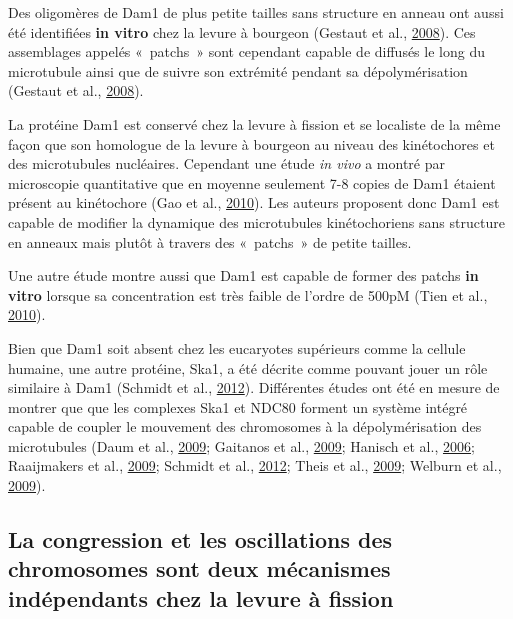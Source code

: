 \documentclass[12pt,a4paper,twoside,openright]{book}
\begin{document}
Des oligomères de Dam1 de plus petite tailles sans structure en anneau
ont aussi été identifiées \textbf{in vitro} chez la levure à bourgeon
(Gestaut et al., \protect\hyperlink{ref-Gestaut2008}{2008}). Ces
assemblages appelés «~patchs~» sont cependant capable de diffusés le
long du microtubule ainsi que de suivre son extrémité pendant sa
dépolymérisation (Gestaut et al.,
\protect\hyperlink{ref-Gestaut2008}{2008}).

La protéine Dam1 est conservé chez la levure à fission et se localiste
de la même façon que son homologue de la levure à bourgeon au niveau des
kinétochores et des microtubules nucléaires. Cependant une étude
\emph{in vivo} a montré par microscopie quantitative que en moyenne
seulement 7-8 copies de Dam1 étaient présent au kinétochore (Gao et al.,
\protect\hyperlink{ref-Gao2010}{2010}). Les auteurs proposent donc Dam1
est capable de modifier la dynamique des microtubules kinétochoriens
sans structure en anneaux mais plutôt à travers des «~patchs~» de petite
tailles.

Une autre étude montre aussi que Dam1 est capable de former des patchs
\textbf{in vitro} lorsque sa concentration est très faible de l'ordre de
500pM (Tien et al., \protect\hyperlink{ref-Tien2010}{2010}).

Bien que Dam1 soit absent chez les eucaryotes supérieurs comme la
cellule humaine, une autre protéine, Ska1, a été décrite comme pouvant
jouer un rôle similaire à Dam1 (Schmidt et al.,
\protect\hyperlink{ref-Schmidt2012}{2012}). Différentes études ont été
en mesure de montrer que que les complexes Ska1 et NDC80 forment un
système intégré capable de coupler le mouvement des chromosomes à la
dépolymérisation des microtubules (Daum et al.,
\protect\hyperlink{ref-Daum2009}{2009}; Gaitanos et al.,
\protect\hyperlink{ref-Gaitanos2009}{2009}; Hanisch et al.,
\protect\hyperlink{ref-Hanisch2006}{2006}; Raaijmakers et al.,
\protect\hyperlink{ref-Raaijmakers2009}{2009}; Schmidt et al.,
\protect\hyperlink{ref-Schmidt2012}{2012}; Theis et al.,
\protect\hyperlink{ref-Theis2009}{2009}; Welburn et al.,
\protect\hyperlink{ref-Welburn2009}{2009}).

\subsection{La congression et les oscillations des chromosomes sont deux
mécanismes indépendants chez la levure à
fission}\label{la-congression-et-les-oscillations-des-chromosomes-sont-deux-muxe9canismes-induxe9pendants-chez-la-levure-uxe0-fission}
\end{document}

